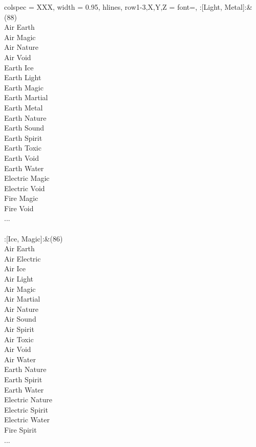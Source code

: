 \begin{longtblr}[
	caption = {2v2 Defending Weak},
	label = {2v2-Defending-Weak},
]{
	colspec = {XXX}, width = 0.95\linewidth,
	hlines,
	row{1-3,X,Y,Z} = {font=\bfseries},
}
	:[Light, Metal]:&{(88)\\
	Air Earth \\
	Air Magic \\
	Air Nature \\
	Air Void \\
	Earth Ice \\
	Earth Light \\
	Earth Magic \\
	Earth Martial \\
	Earth Metal \\
	Earth Nature \\
	Earth Sound \\
	Earth Spirit \\
	Earth Toxic \\
	Earth Void \\
	Earth Water \\
	Electric Magic \\
	Electric Void \\
	Fire Magic \\
	Fire Void \\
	...\\
	}\\

	:[Ice, Magic]:&{(86)\\
	Air Earth \\
	Air Electric \\
	Air Ice \\
	Air Light \\
	Air Magic \\
	Air Martial \\
	Air Nature \\
	Air Sound \\
	Air Spirit \\
	Air Toxic \\
	Air Void \\
	Air Water \\
	Earth Nature \\
	Earth Spirit \\
	Earth Water \\
	Electric Nature \\
	Electric Spirit \\
	Electric Water \\
	Fire Spirit \\
	...\\
	}\\


\end{longtblr}
